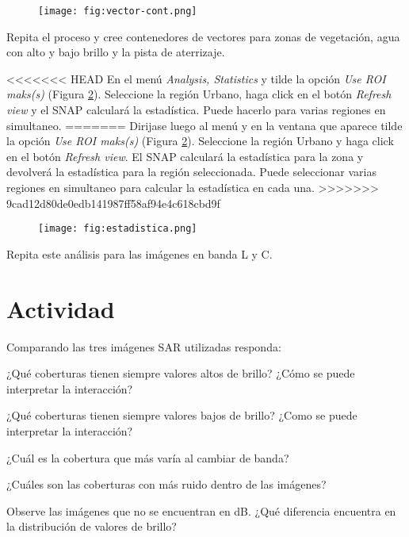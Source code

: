 \begin{figure}[h!]
    \centering
    \texttt{[image: fig:vector-cont.png]}
    \caption{}
    \label{fig:vector-cont}
\end{figure}

Repita el proceso y cree contenedores de vectores para zonas de vegetación, agua con alto y bajo brillo y la pista de aterrizaje.

<<<<<<< HEAD
En el menú \emph{Analysis, Statistics} y tilde la opción \emph{Use ROI maks(s)} (Figura \ref{fig:estadistica}). Seleccione la región Urbano, haga click en el botón \emph{Refresh view} y el SNAP calculará la estadística. Puede hacerlo para varias regiones en simultaneo.
=======
Dirijase luego al menú  y en la ventana que aparece tilde la opción \emph{Use ROI maks(s)} (Figura \ref{fig:estadistica}). Seleccione la región Urbano y haga click en el botón \emph{Refresh view}. El SNAP calculará la estadística para la zona y devolverá la estadística para la región seleccionada. Puede seleccionar varias regiones en simultaneo para calcular la estadística en cada una.
>>>>>>> 9cad12d80de0edb141987ff58af94e4c618cbd9f

\begin{figure}[h!]
    \centering
    \texttt{[image: fig:estadistica.png]}
    \caption{}
    \label{fig:estadistica}
\end{figure}

Repita este análisis para las imágenes en banda L y C.

\section{Actividad}

Comparando las tres imágenes SAR utilizadas responda:

\begin{que}
    ¿Qué coberturas tienen siempre valores altos de brillo? ¿Cómo se puede interpretar la interacción?
\end{que}

\begin{que}
    ¿Qué coberturas tienen siempre valores bajos de brillo? ¿Como se puede interpretar la interacción?
\end{que}

\begin{que}
    ¿Cuál es la cobertura que más varía al cambiar de banda?
\end{que}

\begin{que}
    ¿Cuáles son las coberturas con más ruido dentro de las imágenes?
\end{que}

\begin{que}
    Observe las imágenes que no se encuentran en dB. ¿Qué diferencia encuentra en la distribución de valores de brillo?
\end{que}
